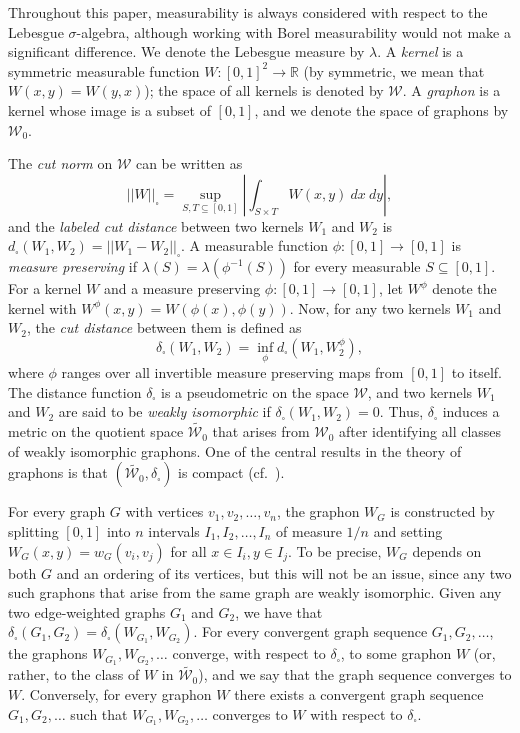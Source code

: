 \documentclass{article}
\begin{document}
Throughout this paper, measurability is always considered with respect to the Lebesgue $\sigma$-algebra, although working with Borel measurability would not make a significant difference. We denote the Lebesgue measure by $\lambda$. A \textit{kernel} is a symmetric measurable function $W:[0,1]^2\rightarrow\mathbb{R}$ (by symmetric, we mean that $W(x,y)=W(y,x)$); the space of all kernels is denoted by $\mathcal{W}$. A \textit{graphon} is a kernel whose image is a subset of $[0,1]$, and we denote the space of graphons by $\mathcal{W}_0$. 

The \textit{cut norm} on $\mathcal{W}$ can be written as \[||W||_\square=\sup_{S,T\subseteq[0,1]}\left|\int_{S\times T} W(x,y)\ dx\ dy\right|,\] and the \textit{labeled cut distance} between two kernels $W_1$ and $W_2$ is $d_\square(W_1,W_2)=||W_1-W_2||_\square$. A measurable function $\phi:[0,1]\rightarrow [0,1]$ is \textit{measure preserving} if $\lambda(S)=\lambda(\phi^{-1}(S))$ for every measurable $S\subseteq[0,1]$. For a kernel $W$ and a measure preserving $\phi:[0,1]\rightarrow[0,1]$, let $W^\phi$ denote the kernel with $W^\phi(x,y)=W(\phi(x),\phi(y))$. Now, for any two kernels $W_1$ and $W_2$, the \textit{cut distance} between them is defined as \[\delta_\square(W_1,W_2)=\inf_{\phi}d_\square(W_1,W_2^\phi),\] where $\phi$ ranges over all invertible measure preserving maps from $[0,1]$ to itself. The distance function $\delta_\square$ is a pseudometric on the space $\mathcal{W}$, and two kernels $W_1$ and $W_2$ are said to be \textit{weakly isomorphic} if $\delta_\square(W_1,W_2)=0$. Thus, $\delta_\square$ induces a metric on the quotient space $\widetilde{\mathcal{W}_0}$ that arises from $\mathcal{W}_0$ after identifying all classes of weakly isomorphic graphons. One of the central results in the theory of graphons is that $(\widetilde{\mathcal{W}_0},\delta_\square)$ is compact (cf.~\cite{compact}).

For every graph $G$ with vertices $v_1,v_2,\dots,v_n$, the graphon $W_G$ is constructed by splitting $[0,1]$ into $n$ intervals $I_1,I_2,\dots,I_n$ of measure $1/n$ and setting $W_G(x,y)=w_G(v_i,v_j)$ for all $x\in I_i,y\in I_j$. To be precise, $W_G$ depends on both $G$ and an ordering of its vertices, but this will not be an issue, since any two such graphons that arise from the same graph are weakly isomorphic. Given any two edge-weighted graphs $G_1$ and $G_2$, we have that $\delta_\square(G_1,G_2)=\delta_\square(W_{G_1},W_{G_2})$. For every convergent graph sequence $G_1,G_2,\dots$, the graphons $W_{G_1},W_{G_2},\dots$ converge, with respect to $\delta_\square$, to some graphon $W$ (or, rather, to the class of $W$ in $\widetilde{\mathcal{W}_0}$), and we say that the graph sequence converges to $W$. Conversely, for every graphon $W$ there exists a convergent graph sequence $G_1,G_2,\dots$ such that $W_{G_1},W_{G_2},\dots$ converges to $W$ with respect to $\delta_\square$.
\end{document}
